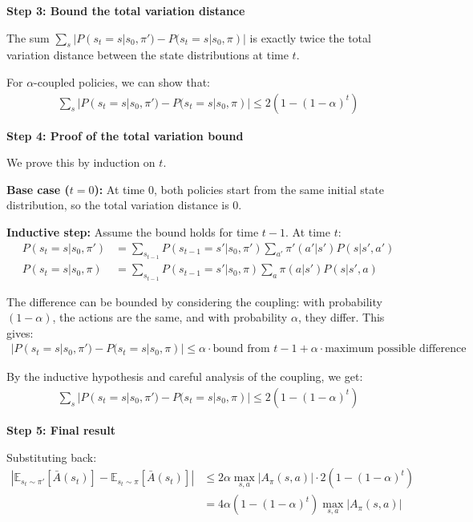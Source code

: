 \textbf{Step 3: Bound the total variation distance}

The sum $\sum_{s} |P(s_t = s | s_0, \pi') - P(s_t = s | s_0, \pi)|$ is exactly twice the total variation distance between the state distributions at time $t$.

For $\alpha$-coupled policies, we can show that:
\begin{align}
\sum_{s} |P(s_t = s | s_0, \pi') - P(s_t = s | s_0, \pi)| \le 2(1-(1-\alpha)^t)
\end{align}

\textbf{Step 4: Proof of the total variation bound}

We prove this by induction on $t$.

\textbf{Base case ($t = 0$):} At time 0, both policies start from the same initial state distribution, so the total variation distance is 0.

\textbf{Inductive step:} Assume the bound holds for time $t-1$. At time $t$:
\begin{align}
P(s_t = s | s_0, \pi') &= \sum_{s_{t-1}} P(s_{t-1} = s' | s_0, \pi') \sum_{a'} \pi'(a'|s') P(s|s',a') \\
P(s_t = s | s_0, \pi) &= \sum_{s_{t-1}} P(s_{t-1} = s' | s_0, \pi) \sum_{a} \pi(a|s') P(s|s',a)
\end{align}

The difference can be bounded by considering the coupling: with probability $(1-\alpha)$, the actions are the same, and with probability $\alpha$, they differ. This gives:
\begin{align}
|P(s_t = s | s_0, \pi') - P(s_t = s | s_0, \pi)| \le \alpha \cdot \text{bound from } t-1 + \alpha \cdot \text{maximum possible difference}
\end{align}

By the inductive hypothesis and careful analysis of the coupling, we get:
\begin{align}
\sum_{s} |P(s_t = s | s_0, \pi') - P(s_t = s | s_0, \pi)| \le 2(1-(1-\alpha)^t)
\end{align}

\textbf{Step 5: Final result}

Substituting back:
\begin{align}
|\mathbb{E}_{s_t \sim \pi'}[\bar{A}(s_t)] - \mathbb{E}_{s_t \sim \pi}[\bar{A}(s_t)]| &\le 2\alpha \max_{s, a}|A_{\pi}(s,a)| \cdot 2(1-(1-\alpha)^t) \\
&= 4\alpha(1-(1-\alpha)^t)\max_{s, a}|A_\pi(s, a)|
\end{align}


